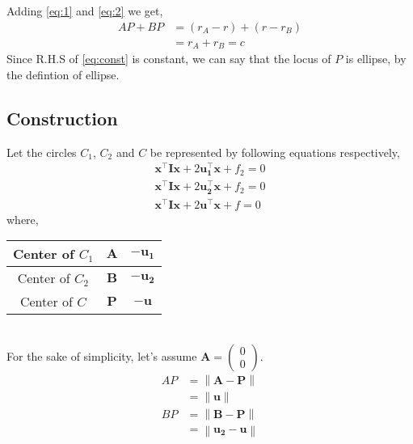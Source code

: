 \documentclass[journal,12pt,twocolumn]{IEEEtran}
\let\vec\mathbf
\newcommand{\myvec}[1]{\ensuremath{\begin{pmatrix}#1\end{pmatrix}}}
\providecommand{\norm}[1]{\left\lVert#1\right\rVert}
\begin{document}
Adding \eqref{eq:1} and \eqref{eq:2} we get,
\begin{equation} \label{eq:const}
\begin{split}
	AP + BP &= (r_A-r) + (r-r_B) \\
	&=r_A+r_B = c 
\end{split}
\end{equation}
Since R.H.S of \eqref{eq:const} is constant, we can say that the locus of $P$ is ellipse, by the defintion of ellipse.

\subsection*{\textbf{Construction}}
Let the circles $C_1$, $C_2$ and $C$ be represented by following equations respectively,
\begin{align*}
		\vec{x^{\top}}\vec{I}\vec{x} + 2\vec{u_1^{\top}}\vec{x} + f_2 = 0 \\
		\vec{x^{\top}}\vec{I}\vec{x} + 2\vec{u_2^{\top}}\vec{x} + f_2 = 0 \\
		\vec{x^{\top}}\vec{I}\vec{x} + 2\vec{u^{\top}}\vec{x} + f = 0
\end{align*}
where,
\begin{table}[h]
		\normalsize
	\centering
	\begin{tabular}[20pt]{|c|c|c|}
		\hline
			Center of $C_1$&$\vec{A}$&$-\vec{u_1}$\\
		\hline                           
			Center of $C_2$&$\vec{B}$&$\vec{-u_2}$\\
		\hline                           
			Center of $C$&$\vec{P}$&$\vec{-u}$\\
		\hline
	\end{tabular}
\end{table} \\
For the sake of simplicity, let's assume $\vec{A} = \myvec{0\\0}$.%
\begin{align*}
	AP &= \norm{\vec{A}-\vec{P}} \\
	&= \norm{\vec{u}} \\
	BP &= \norm{\vec{B}-\vec{P}} \\
	&= \norm{\vec{u_2-u}}
\end{align*} 
\end{document}
